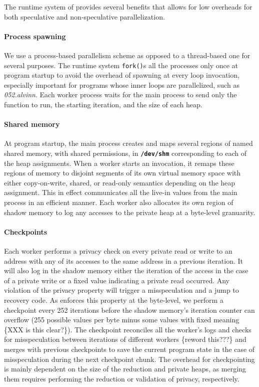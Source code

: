The runtime system of \name provides several benefits that allows for
low overheads for both speculative and non-speculative parallelization.

\paragraph{Process spawning}
We use a process-based parallelism scheme as opposed to a thread-based one
for several purposes. The runtime system \texttt{fork()}s all the processes
only once at program startup to avoid the overhead of spawning at every loop
invocation, especially important for programs whose inner loops are
parallelized, such as \textit{052.alvinn}. Each worker process waits for the main
process to send only the function to run, the starting iteration, and the
size of each heap.

\paragraph{Shared memory}
At program startup, the main process creates and maps several regions of named shared
memory, with shared permissions, in \texttt{\textbf{/dev/shm}} corresponding
to each of the heap assignments.
When a worker starts an invocation, it remaps these regions of memory to
disjoint segments of its own virtual memory space with either
copy-on-write, shared, or read-only semantics depending on the heap
assignment. This in effect communicates all the live-in values from the
main process in an efficient manner. Each worker also allocates its own
region of shadow memory to log any accesses to the private heap at a
byte-level granuarity.

\paragraph{Checkpoints}
Each worker performs a privacy check on every private read or write to an
address with any of its accesses to the same address in a previous
iteration. It will also log in the shadow memory either the iteration of the
access in the case of a private write or a fixed value indicating a
private read occurred. Any violation of the privacy property will trigger a
misspeculation and a jump to recovery code. As \name enforces this
property at the byte-level, we perform a checkpoint every 252 iterations
before the shadow memory's iteration counter can overflow (255 possible
values per byte minus some values with fixed meaning \{XXX is this
clear?\}). The checkpoint reconciles all the worker's logs and checks for
misspeculation between iterations of different workers \{reword this???\} and
merges with previous checkpoints to save the current program state in the
case of misspeculation during the next checkpoint chunk. The overhead for
checkpointing is mainly dependent on the size of the reduction and private heaps,
as merging them requires performing the reduction or validation of privacy,
respectively.

